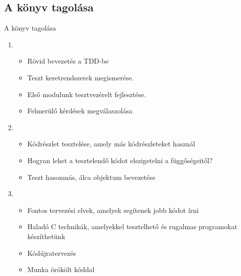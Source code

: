 \subsection{A könyv tagolása}

\begin{frame}{A könyv tagolása}
  \begin{enumerate}[<+->]
  \item
    \begin{itemize}
    \item Rövid bevezetés a TDD-be
    \item Teszt keretrendszerek megismerése.
    \item Első modulunk tesztvezérelt fejlesztése.
    \item Felmerülő kérdések megválaszolása
    \end{itemize}

  \item
    \begin{itemize}
    \item Kódrészlet tesztelése, amely más kódrészleteket használ
    \item Hogyan lehet a tesztelendő kódot elszigetelni a függőségeitől?
    \item Teszt hasonmás, álca objektum bevezetése
    \end{itemize}

  \item
    \begin{itemize}
    \item Fontos tervezési elvek, amelyek segítenek jobb kódot írni
    \item Haladó C technikák, amelyekkel tesztelhető és rugalmas programokat készíthetünk
    \item Kódújratervezés
    \item Munka örökölt kóddal
    \end{itemize}
  \end{enumerate}
\end{frame}

